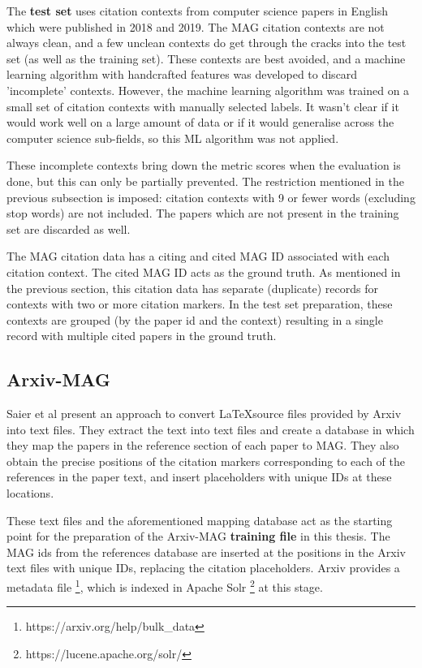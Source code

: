 The \textbf{test set} uses citation contexts from computer science papers in English which were published in 2018 and 2019. The MAG citation contexts are not always clean, and a few unclean contexts do get through the cracks into the test set (as well as the training set). These contexts are best avoided, and a machine learning algorithm with handcrafted features was developed to discard 'incomplete' contexts. However, the machine learning algorithm was trained on a small set of citation contexts with manually selected labels. It wasn't clear if it would work well on a large amount of data or if it would generalise across the computer science sub-fields, so this ML algorithm was not applied.

These incomplete contexts bring down the metric scores when the evaluation is done, but this can only be partially prevented. The restriction mentioned in the previous subsection is imposed: citation contexts with 9 or fewer words (excluding stop words) are not included. The papers which are not present in the training set are discarded as well.  

The MAG citation data has a citing and cited MAG ID associated with each citation context. The cited MAG ID acts as the ground truth. As mentioned in the previous section, this citation data has separate (duplicate) records for contexts with two or more citation markers. In the test set preparation, these contexts are grouped (by the paper id and the context) resulting in a single record with multiple cited papers in the ground truth. 

\subsection{Arxiv-MAG}
Saier et al \cite{SaierF19} present an approach to convert \LaTeX source files provided by Arxiv into text files. They extract the text into text files and create a database in which they map the papers in the reference section of each paper to MAG. They also obtain the precise positions of the citation markers corresponding to each of the references in the paper text, and insert placeholders with unique IDs at these locations.

These text files and the aforementioned mapping database act as the starting point for the preparation of the Arxiv-MAG \textbf{training file} in this thesis. The MAG ids from the references database are inserted at the positions in the Arxiv text files with unique IDs, replacing the citation placeholders. Arxiv provides a metadata file \footnote{https://arxiv.org/help/bulk\_data}, which is indexed in Apache Solr \footnote{https://lucene.apache.org/solr/} at this stage.

